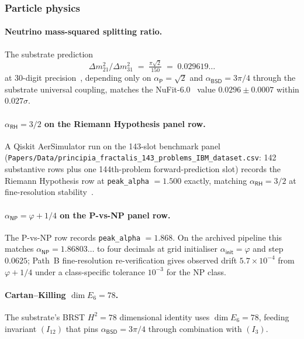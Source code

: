 \documentclass[11pt,a4paper]{amsart}
\theoremstyle{plain}
\theoremstyle{definition}
\begin{document}
\subsubsection*{Particle physics}

\paragraph{Neutrino mass-squared splitting ratio.} The substrate prediction
\[
\Delta m^2_{21} / \Delta m^2_{31} \;=\; \tfrac{\pi \sqrt{2}}{150} \;=\; 0.029619\ldots
\]
at 30-digit precision~\cite{cohen2026book}, depending only on $\alpha_{\textsf{P}} = \sqrt{2}$ and $\alpha_{\textsf{BSD}} = 3\pi/4$ through the substrate universal coupling, matches the NuFit-6.0~\cite{nufit-6.0} value $0.0296 \pm 0.0007$ within $0.027\sigma$.

\paragraph{$\alpha_{\textsf{RH}} = 3/2$ on the Riemann Hypothesis panel row.} A Qiskit AerSimulator run on the 143-slot benchmark panel (\texttt{Papers/Data/principia\_fractalis\_143\_problems\_IBM\_dataset.csv}: 142 substantive rows plus one 144th-problem forward-prediction slot) records the Riemann Hypothesis row at \texttt{peak\_alpha} $= 1.500$ exactly, matching $\alpha_{\textsf{RH}} = 3/2$ at fine-resolution stability~\cite{cohen2026corroborating}.

\paragraph{$\alpha_{\textsf{NP}} = \varphi + 1/4$ on the P-vs-NP panel row.} The P-vs-NP row records \texttt{peak\_alpha} $= 1.868$. On the archived pipeline this matches $\alpha_{\textsf{NP}} = 1.86803\ldots$ to four decimals at grid initialiser $\alpha_{\textsf{init}} = \varphi$ and step $0.0625$; Path~B fine-resolution re-verification gives observed drift $5.7 \times 10^{-4}$ from $\varphi + 1/4$ under a class-specific tolerance $10^{-3}$ for the NP class.

\paragraph{Cartan--Killing $\dim E_6 = 78$.} The substrate's BRST $H^2 = 78$ dimensional identity uses $\dim E_6 = 78$, feeding invariant $(I_{12})$ that pins $\alpha_{\textsf{BSD}} = 3\pi/4$ through combination with $(I_3)$.
\end{document}
